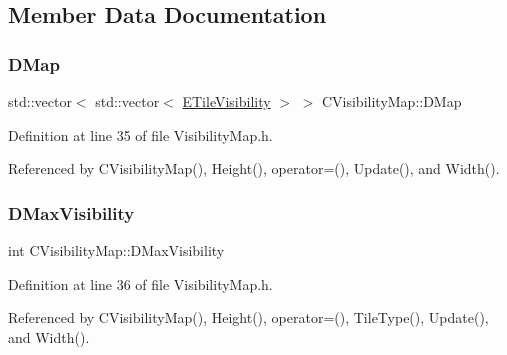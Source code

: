 \subsection{Member Data Documentation}
\hypertarget{classCVisibilityMap_ad217bc34f7a50dd357a3eeeb69cfdd85}{}\label{classCVisibilityMap_ad217bc34f7a50dd357a3eeeb69cfdd85} 
\subsubsection{\texorpdfstring{D\+Map}{DMap}}
{\footnotesize\ttfamily std\+::vector$<$ std\+::vector$<$ \hyperlink{classCVisibilityMap_a6665f905da08825adbb0eee7bd1f2f30}{E\+Tile\+Visibility} $>$ $>$ C\+Visibility\+Map\+::\+D\+Map\hspace{0.3cm}{\ttfamily [protected]}}



Definition at line 35 of file Visibility\+Map.\+h.



Referenced by C\+Visibility\+Map(), Height(), operator=(), Update(), and Width().

\hypertarget{classCVisibilityMap_ac8f71b9541c903fce0294d75daa1bbb1}{}\label{classCVisibilityMap_ac8f71b9541c903fce0294d75daa1bbb1} 
\subsubsection{\texorpdfstring{D\+Max\+Visibility}{DMaxVisibility}}
{\footnotesize\ttfamily int C\+Visibility\+Map\+::\+D\+Max\+Visibility\hspace{0.3cm}{\ttfamily [protected]}}



Definition at line 36 of file Visibility\+Map.\+h.



Referenced by C\+Visibility\+Map(), Height(), operator=(), Tile\+Type(), Update(), and Width().

\hypertarget{classCVisibilityMap_a9bd6e633268535677aeefbd886c29485}{}\label{classCVisibilityMap_a9bd6e633268535677aeefbd886c29485} 
